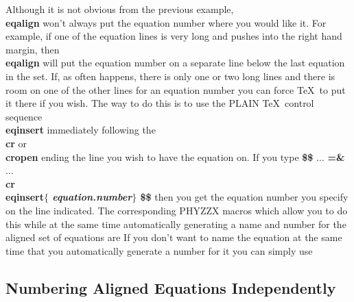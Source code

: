 Although it is not obvious from the previous example, {\bf \\eqalign}
won't always put the equation number where you would like it.
For example, if one of the equation lines is very long and
pushes into the right hand margin, then {\bf \\eqalign} will
put the equation number on a separate line below the last equation
in the set.
If, as often happens, there is only one or two long lines and
there is room on one of the other lines for an equation number
you can force \TeX\ to put it there if you wish.
The way to do this is to use the PLAIN \TeX\ control sequence
{\bf \\eqinsert} immediately following the {\bf \\cr} or
{\bf \\cropen} ending the line you wish to have the equation on.
If you type \nextline
{\bf \$\$} $\ldots$ {\bf =\&} $\ldots$ {\bf \\cr \\eqinsert$\{$
{\it equation.number}$\}$ \$\$ } \nextline
then you get the equation number you specify on the line
indicated.
The corresponding PHYZZX macros which allow you to do this
while at the same time automatically generating a name and number
for the aligned set of equations are
If you don't want to name the equation at the same time that
you automatically generate a number for it you can simply use
\tc{\\eqinsert\\eq}
 
\subsection{Numbering Aligned Equations Independently}
 
